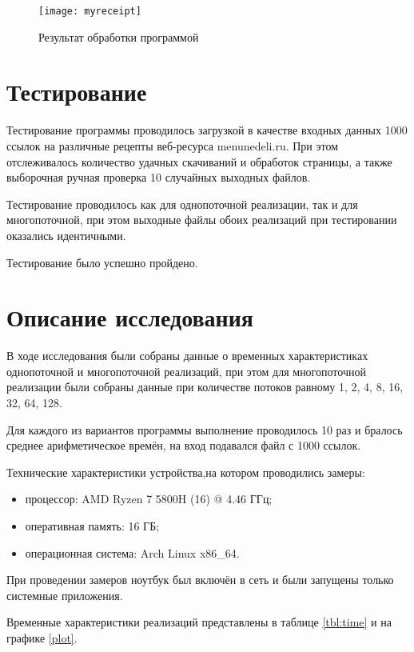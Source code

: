 \begin{figure}[h]
	\centering
	\texttt{[image: myreceipt]}
	\caption{Результат обработки программой}
	\label{after}
\end{figure}

\vspace{20mm}
{\let\clearpage\relax \chapter{Тестирование}}

Тестирование программы проводилось загрузкой в качестве входных данных 1000 ссылок на различные рецепты веб-ресурса menunedeli.ru. При этом отслеживалось количество удачных скачиваний и обработок страницы, а также выборочная ручная проверка 10 случайных выходных файлов. 

Тестирование проводилось как для однопоточной реализации, так и для многопоточной, при этом выходные файлы обоих реализаций при тестировании оказались идентичными.

Тестирование было успешно пройдено.

\vspace{20mm}
{\let\clearpage\relax \chapter{Описание исследования}}

В ходе исследования были собраны данные о временных характеристиках однопоточной и многопоточной реализаций, при этом для многопоточной реализации были собраны данные при количестве потоков равному 1, 2, 4, 8, 16, 32, 64, 128.

Для каждого из вариантов программы выполнение проводилось 10 раз и бралось среднее арифметическое времён, на вход подавался файл с 1000 ссылок.

Технические характеристики устройства,на котором проводились замеры:

\begin{itemize}
	\item процессор: AMD Ryzen 7 5800H (16) @ 4.46 ГГц;
	\item оперативная память: 16 ГБ;
	\item операционная система: Arch Linux x86\_64.
\end{itemize}

При проведении замеров ноутбук был включён в сеть и были запущены только системные приложения.

Временные характеристики реализаций представлены в таблице \ref{tbl:time} и на графике \ref{plot}.

